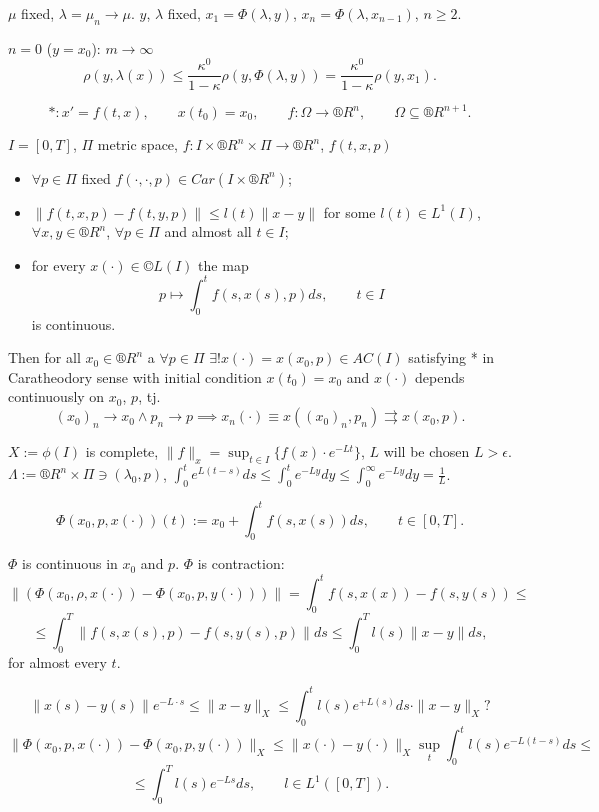 \documentclass[12pt]{article}					%
\begin{document}
\begin{veta}
\begin{dukazin}
		$\mu$ fixed, $\lambda = \mu_n \rightarrow \mu$. $y$, $\lambda$ fixed, $x_1 = \Phi(\lambda, y)$, $x_n = \Phi(\lambda, x_{n-1})$, $n ≥ 2$.

		$n = 0$ ($y = x_0$): $m \rightarrow ∞$
		$$ \rho(y, \lambda(x)) ≤ \frac{\kappa^0}{1 - \kappa} \rho(y, \Phi(\lambda, y)) = \frac{\kappa^0}{1 - \kappa}\rho(y, x_1). $$
	\end{dukazin}
\end{veta}

\begin{veta}
	$$ *: x' = f(t, x), \qquad x(t_0) = x_0, \qquad f: \Omega \rightarrow ®R^n, \qquad \Omega \subseteq ®R^{n+1}. $$

	$I = [0, T]$, $\Pi$ metric space, $f: I \times ®R^n\times \Pi \rightarrow ®R^n$, $f(t, x, p)$
	\begin{itemize}
		\item $\forall p \in \Pi$ fixed $f(·, ·, p) \in Car(I \times ®R^n)$;
		\item $\|f(t, x, p) - f(t, y, p)\| ≤ l(t)\|x - y\|$ for some $l(t) \in L^1(I)$, $\forall x, y \in ®R^n$, $\forall p \in \Pi$ and almost all $t \in I$;
		\item for every $x(·) \in ©L(I)$ the map
			$$ p \mapsto \int_0^t f(s, x(s), p) ds, \qquad t \in I $$
			is continuous.
	\end{itemize}

	Then for all $x_0 \in ®R^n$ a $\forall p \in \Pi$ $\exists! x( ·) = x(x_0, p) \in AC(I)$ satisfying * in Caratheodory sense with initial condition $x(t_0) = x_0$ and $x(·)$ depends continuously on $x_0$, $p$, tj.
	$$ (x_0)_n \rightarrow x_0 \land p_n \rightarrow p \implies x_n(·) ≡ x((x_0)_n, p_n) \rightrightarrows x(x_0, p). $$

	\begin{dukazin}
		$X := \phi(I)$ is complete, $\|f\|_x = \sup_{t \in I} \{f(x)·e^{-L t}\}$, $L$ will be chosen $L > \epsilon$. $\Lambda := ®R^n \times \Pi \ni (\lambda_0, p)$, $\int_0^t e^{L(t - s)} ds ≤ \int_0^t e^{-L y} dy ≤ \int_0^∞ e^{-L y} dy = \frac{1}{L}$.

		$$ \Phi(x_0, p, x(·)) (t) := x_0 + \int_0^t f(s, x(s)) ds, \qquad t \in [0, T]. $$

		$\Phi$ is continuous in $x_0$ and $p$. $\Phi$ is contraction:
		$$ \|(\Phi(x_0, \rho, x(·)) - \Phi(x_0, p, y(·)))\| = \int_0^t f(s, x(x)) - f(s, y(s)) ≤ $$
		$$ ≤ \int_0^T \|f(s, x(s), p) - f(s, y(s), p)\| ds ≤ \int_0^T l(s) \|x - y\| ds, $$
		for almost every $t$.

		$$ \|x(s) - y(s)\| e^{-L·s} ≤ \|x - y\|_X ≤ \int_0^t l(s) e^{+L(s)} ds·\|x - y\|_X ? $$
		$$ \|\Phi(x_0, p, x(·)) - \Phi(x_0, p, y(·))\|_X ≤ \|x(·) - y(·)\|_X \sup_t \int_0^t l(s) e^{-L(t - s)} ds ≤ $$
		$$ ≤ \int_0^T l(s) e^{-L s} ds, \qquad l \in L^1([0, T]). $$


\end{dukazin}
\end{veta}
\end{document}
